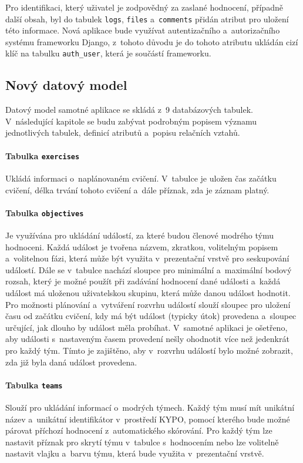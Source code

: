 \documentclass[
  digital,
  twoside,
  table, 
  nolof, 
  nolot
]{fithesis3}
\begin{document}
Pro identifikaci, který uživatel je zodpovědný za zaslané hodnocení, případně další obsah, byl do tabulek \texttt{logs}, \texttt{files} a~\texttt{comments} přidán atribut pro uložení této informace. Nová aplikace bude využívat autentizačního a~autorizačního systému frameworku Django, z~tohoto důvodu je do tohoto atributu ukládán cizí klíč na tabulku \texttt{auth\_user}, která je součástí frameworku.

\subsection{Nový datový model}

Datový model samotné aplikace se skládá z~9 databázových tabulek. V~následující kapitole se budu zabývat podrobným popisem významu jednotlivých tabulek, definicí atributů a~popisu relačních vztahů.

\paragraph{Tabulka \texttt{exercises}} Ukládá informaci o~naplánovaném cvičení. V~tabulce je uložen čas začátku cvičení, délka trvání tohoto cvičení a~dále příznak, zda je záznam platný.

\paragraph{Tabulka \texttt{objectives}} Je využívána pro ukládání událostí, za které budou členové modrého týmu hodnoceni. Každá událost je tvořena názvem, zkratkou, volitelným popisem a~volitelnou fázi, která může být využita v~prezentační vrstvě pro seskupování událostí. Dále se v~tabulce nachází sloupce pro minimální a~maximální bodový rozsah, který je možné použít při zadávání hodnocení dané události a~každá událost má uloženou uživatelskou skupinu, která může danou událost hodnotit. Pro možnosti plánování a~vytváření rozvrhu událostí slouží sloupec pro uložení času od začátku cvičení, kdy má být událost (typicky útok) provedena a~sloupec určující, jak dlouho by událost měla probíhat. V~samotné aplikaci je ošetřeno, aby události s~nastaveným časem provedení nešly ohodnotit více než jedenkrát pro každý tým. Tímto je zajištěno, aby v~rozvrhu událostí bylo možné zobrazit, zda již byla daná událost provedena. 

\paragraph{Tabulka \texttt{teams}} Slouží pro ukládání informací o~modrých týmech. Každý tým musí mít unikátní název a~unikátní identifikátor v~prostředí KYPO, pomocí kterého bude možné párovat příchozí hodnocení z~automatického skórování. Pro každý tým lze nastavit příznak pro skrytí týmu v~tabulce s~hodnocením nebo lze volitelně nastavit vlajku a~barvu týmu, která bude využita v~prezentační vrstvě.
\end{document}
